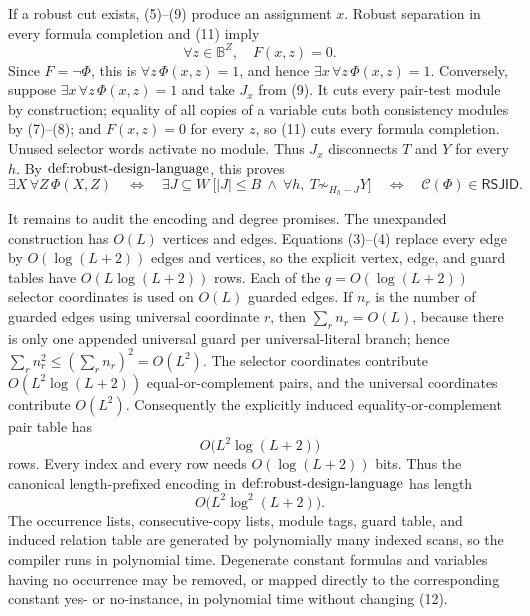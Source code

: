 If a robust cut exists, (5)--(9) produce an assignment \(x\).  Robust separation in every formula completion and (11) imply
\[
\forall z\in\mathbb B^Z,\quad F(x,z)=0.
\]
Since \(F=\neg\Phi\), this is \(\forall z\,\Phi(x,z)=1\), and hence \(\exists x\,\forall z\,\Phi(x,z)=1\).  Conversely, suppose \(\exists x\,\forall z\,\Phi(x,z)=1\) and take \(J_x\) from (9).  It cuts every pair-test module by construction; equality of all copies of a variable cuts both consistency modules by (7)--(8); and \(F(x,z)=0\) for every \(z\), so (11) cuts every formula completion.  Unused selector words activate no module.  Thus \(J_x\) disconnects \(T\) and \(Y\) for every \(h\).  By \(\textnormal{def:robust-design-language}\), this proves
\[
\exists X\,\forall Z\,\Phi(X,Z)
\quad\Longleftrightarrow\quad
\exists J\subseteq W\ \bigl[|J|\le B\ \wedge\ \forall h,\ T\not\sim_{H_h-J}Y\bigr]
\quad\Longleftrightarrow\quad
\mathcal C(\Phi)\in\mathsf{RSJID}. \tag{12}
\]

It remains to audit the encoding and degree promises.  The unexpanded construction has \(O(L)\) vertices and edges.  Equations (3)--(4) replace every edge by \(O(\log(L+2))\) edges and vertices, so the explicit vertex, edge, and guard tables have \(O(L\log(L+2))\) rows.  Each of the \(q=O(\log(L+2))\) selector coordinates is used on \(O(L)\) guarded edges.  If \(n_r\) is the number of guarded edges using universal coordinate \(r\), then \(\sum_r n_r=O(L)\), because there is only one appended universal guard per universal-literal branch; hence \(\sum_r n_r^2\le(\sum_r n_r)^2=O(L^2)\).  The selector coordinates contribute \(O(L^2\log(L+2))\) equal-or-complement pairs, and the universal coordinates contribute \(O(L^2)\).  Consequently the explicitly induced equality-or-complement pair table has
\[
O\bigl(L^2\log(L+2)\bigr) \tag{13}
\]
rows.  Every index and every row needs \(O(\log(L+2))\) bits.  Thus the canonical length-prefixed encoding in \(\textnormal{def:robust-design-language}\) has length
\[
O\bigl(L^2\log^2(L+2)\bigr). \tag{14}
\]
The occurrence lists, consecutive-copy lists, module tags, guard table, and induced relation table are generated by polynomially many indexed scans, so the compiler runs in polynomial time.  Degenerate constant formulas and variables having no occurrence may be removed, or mapped directly to the corresponding constant yes- or no-instance, in polynomial time without changing (12).

